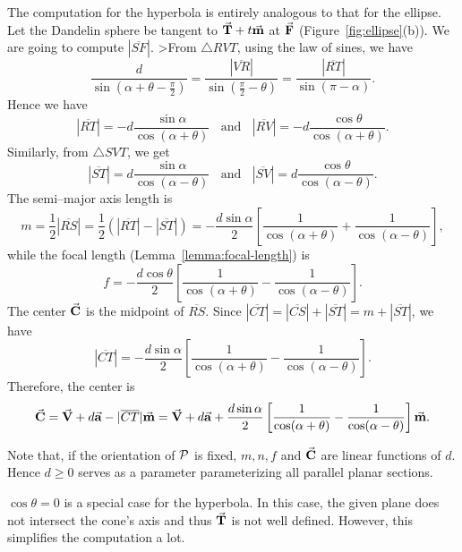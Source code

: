 The computation for the hyperbola is entirely analogous to that for the
ellipse.  Let the Dandelin sphere  be 
tangent to 
$\vec{\bf T}+t\vec{\bf m}$ at $\vec{\bf F}$ (Figure~\ref{fig:ellipse}(b)). 
We are going to compute $|\overline{SF}|$.  
>From $\bigtriangleup RVT$, using the law of sines, we have
\[ \frac{d}{\sin\left(\alpha+\theta-\frac{\pi}{2}\right)}=
     \frac{|\overline{VR}|}{\sin\left(\frac{\pi}{2}-\theta\right)} = 
     \frac{|\overline{RT}|}{\sin(\pi-\alpha)}. \]
Hence we have
\[ |\overline{RT}|=-d\frac{\sin\alpha}{\cos(\alpha+\theta)}\ \ \ \ \mbox{and}
     \ \ \ \ |\overline{RV}|=-d\frac{\cos\theta}{\cos(\alpha+\theta)}. \]
Similarly, from $\bigtriangleup SVT$, we get
\[ |\overline{ST}|=d\frac{\sin\alpha}{\cos(\alpha-\theta)}\ \ \ \ \mbox{and}
     \ \ \ \ |\overline{SV}|=d\frac{\cos\theta}{\cos(\alpha-\theta)}. \]
The semi--major axis length is
\[    m=\frac{1}{2}|\overline{RS}|=\frac{1}{2}(|\overline{RT}|-|\overline{ST}|)
     =-\frac{d\sin\alpha}{2}\left[
                    \frac{1}{\cos(\alpha+\theta)} +
                    \frac{1}{\cos(\alpha-\theta)} \right],  \]
while the focal length (Lemma~\ref{lemma:focal-length}) is
\[     f=-\frac{d\cos\theta}{2}\left[
                    \frac{1}{\cos(\alpha+\theta)} -
                    \frac{1}{\cos(\alpha-\theta)} \right]. \]
The center $\vec{\bf C}$ is the midpoint of $\overline{RS}$.  
Since $|\overline{CT}|=|\overline{CS}|+|\overline{ST}|=m+|\overline{ST}|$,
we have
\[ |\overline{CT}|=-\frac{d\sin\alpha}{2}\left[
        \frac{1}{\cos(\alpha+\theta)}-\frac{1}{\cos(\alpha-\theta)}\right]. \]
Therefore, the center is
\[  \vec{\bf C} = \vec{\bf V}+d\vec{\bf a}-|\overline{CT}|\vec{\bf m} 
              = \vec{\bf V}+d\vec{\bf a}+\frac{d\sin\alpha}{2}\left[
        \frac{1}{\cos(\alpha+\theta)}-\frac{1}{\cos(\alpha-\theta)}\right]
          \vec{\bf m}.   \]
\fi
\QED

     Note that, if the orientation of ${\cal P}$ is fixed, $m, n, f$ and 
$\vec{\bf C}$ are linear functions of $d$.  Hence  $d\geq 0$ serves as a 
parameter parameterizing all parallel planar sections.

     $\cos \theta = 0$ is a special case for the hyperbola.  In this case, the
given plane does not intersect the cone's axis and thus $\vec{\bf T}$ is not
well defined.  However, this simplifies the computation a lot.

